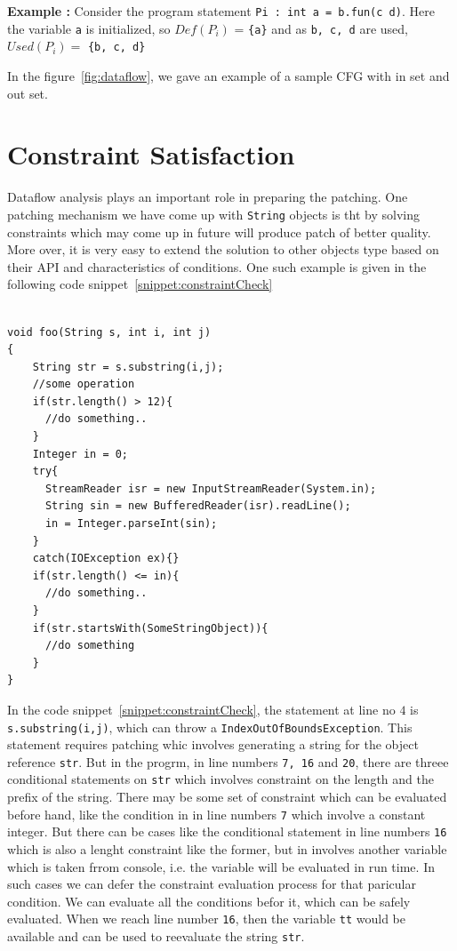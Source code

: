 \textbf{Example : } Consider the program statement \texttt{Pi : int a = b.fun(c
d)}.
Here the variable \texttt{a} is initialized, so $Def(P_i)$ = \texttt{\{a\}} and
as
\texttt{b, c, d} are used, $Used(P_i) =$ \texttt{\{b, c, d\}}

In the figure~\ref{fig:dataflow}, we gave an example of a sample CFG with in set
and out set.

\section{Constraint Satisfaction}
\label{sec:constraintSatisfaction}

Dataflow analysis plays an important role in preparing the patching. One
patching mechanism we have come up with \texttt{String} objects is tht by
solving constraints which may come up in future will produce patch of better
quality. More over, it is very easy to extend the solution to other objects type
based on their API and characteristics of conditions. One such example is given
in the following code snippet~\ref{snippet:constraintCheck}

\onehalfspacing
\lstset{language=Java, caption=Better patching mechanism with constraint
satisfaction, label = snippet:constraintCheck}
\begin{lstlisting}

void foo(String s, int i, int j)
{
	String str = s.substring(i,j);
	//some operation
	if(str.length() > 12){
	  //do something..
	}
	Integer in = 0;
	try{
	  StreamReader isr = new InputStreamReader(System.in);
	  String sin = new BufferedReader(isr).readLine();
	  in = Integer.parseInt(sin);
	}
	catch(IOException ex){}
	if(str.length() <= in){
	  //do something..
	}
	if(str.startsWith(SomeStringObject)){
	  //do something
	}
}

\end{lstlisting}

In the code snippet~\ref{snippet:constraintCheck}, the statement at line no $4$
is \texttt{s.substring(i,j)}, which can throw a
\texttt{IndexOutOfBoundsException}. This statement requires patching whic
involves generating a string for the object reference \texttt{str}. But in the
progrm, in line numbers \texttt{7, 16} and \texttt{20}, there are threee
conditional statements on \texttt{str} which involves constraint on the length
and the prefix of the string. There may be some set of constraint which can be
evaluated before hand, like the condition in in line numbers \texttt{7} which
involve a constant integer. But there can be cases like the conditional
statement in line numbers \texttt{16} which is also a lenght constraint like the
former, but in involves another variable which is taken frrom console, i.e. the
variable will be evaluated in run time. In such cases we can defer the
constraint evaluation process for that paricular condition. We can evaluate all
the conditions befor it, which can be safely evaluated. When we reach line
number \texttt{16}, then the variable \texttt{tt} would be available and can be
used to reevaluate the string \texttt{str}.

